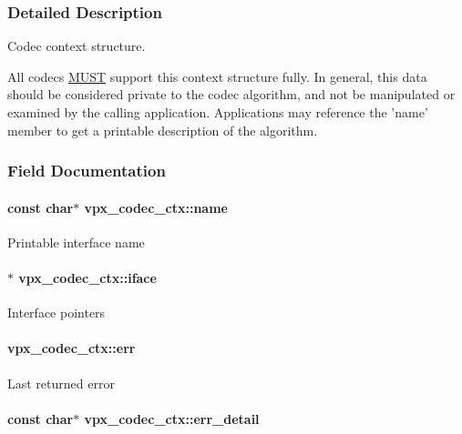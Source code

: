 \subsubsection{Detailed Description}
Codec context structure. 

All codecs \hyperlink{rfc2119_MUST}{M\-U\-S\-T} support this context structure fully. In general, this data should be considered private to the codec algorithm, and not be manipulated or examined by the calling application. Applications may reference the 'name' member to get a printable description of the algorithm. 

\subsubsection{Field Documentation}
\hypertarget{structvpx__codec__ctx_a7ed1bf8f6434ea2df01da8011849c6cb}{
\paragraph[{name}]{\setlength{\rightskip}{0pt plus 5cm}const char$\ast$ vpx\-\_\-codec\-\_\-ctx\-::name}}\label{structvpx__codec__ctx_a7ed1bf8f6434ea2df01da8011849c6cb}
Printable interface name \hypertarget{structvpx__codec__ctx_af5986790e3420beda77f3a9b64f6b953}{
\paragraph[{iface}]{$\ast$ vpx\-\_\-codec\-\_\-ctx\-::iface}}\label{structvpx__codec__ctx_af5986790e3420beda77f3a9b64f6b953}
Interface pointers \hypertarget{structvpx__codec__ctx_a6f448802b0675013fd8c5179675c30de}{
\paragraph[{err}]{ vpx\-\_\-codec\-\_\-ctx\-::err}}\label{structvpx__codec__ctx_a6f448802b0675013fd8c5179675c30de}
Last returned error \hypertarget{structvpx__codec__ctx_ad785c88ae862dd9129965c72723260bd}{
\paragraph[{err\-\_\-detail}]{\setlength{\rightskip}{0pt plus 5cm}const char$\ast$ vpx\-\_\-codec\-\_\-ctx\-::err\-\_\-detail}}\label{structvpx__codec__ctx_ad785c88ae862dd9129965c72723260bd}
